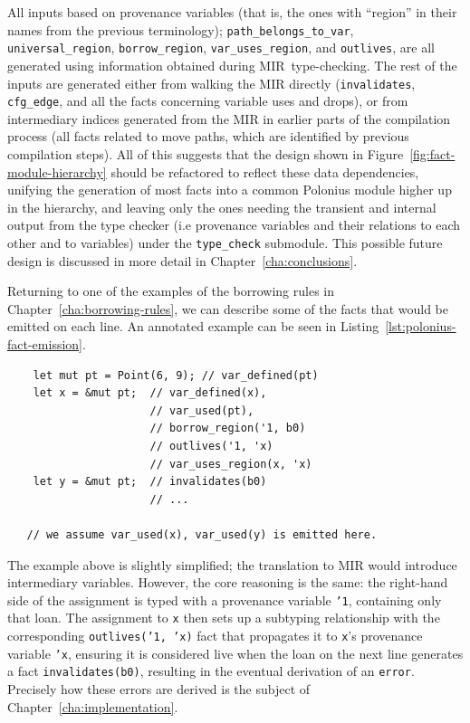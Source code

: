 \documentclass[11pt,a4paper,twoside,openany]{report}
\newenvironment{sourcecode}{\captionsetup{type=listing}}{}
\newcommand{\InRust}[1]{\texttt{#1}}
\newcommand{\InDatalog}[1]{\texttt{#1}}
\begin{document}
All inputs based on provenance variables (that is, the ones with ``region'' in
their names from the previous terminology); \texttt{path\_belongs\_to\_var},
\texttt{universal\_region}, \texttt{borrow\_region}, \texttt{var\_uses\_region},
and \texttt{outlives}, are all generated using information obtained during
MIR~type-checking. The rest of the inputs are generated either from walking the
MIR directly (\texttt{invalidates}, \texttt{cfg\_edge}, and all the facts
concerning variable uses and drops), or from intermediary indices generated from
the MIR in earlier parts of the compilation process (all facts related to move
paths, which are identified by previous compilation steps). All of this suggests
that the design shown in Figure~\ref{fig:fact-module-hierarchy} should be
refactored to reflect these data dependencies, unifying the generation of most
facts into a common Polonius module higher up in the hierarchy, and leaving only
the ones needing the transient and internal output from the type checker (i.e
provenance variables and their relations to each other and to variables) under
the \texttt{type\_check} submodule. This possible future design is discussed in
more detail in Chapter~\ref{cha:conclusions}.

Returning to one of the examples of the borrowing rules in
Chapter~\ref{cha:borrowing-rules}, we can describe some of the facts that would
be emitted on each line. An annotated example can be seen in
Listing~\ref{lst:polonius-fact-emission}.

\begin{sourcecode}
  \label{lst:polonius-fact-emission}
\begin{verbatim}
    let mut pt = Point(6, 9); // var_defined(pt)
    let x = &mut pt;  // var_defined(x),
                      // var_used(pt),
                      // borrow_region('1, b0)
                      // outlives('1, 'x)
                      // var_uses_region(x, 'x)
    let y = &mut pt;  // invalidates(b0)
                      // ...

   // we assume var_used(x), var_used(y) is emitted here.
\end{verbatim}
\end{sourcecode}

The example above is slightly simplified; the translation to MIR would introduce
intermediary variables. However, the core reasoning is the same: the right-hand
side of the assignment is typed with a provenance variable \InRust{'1},
containing only that loan. The assignment to \InRust{x} then sets up a subtyping
relationship with the corresponding \InDatalog{outlives('1, 'x)} fact that
propagates it to \InRust{x}'s provenance variable \InRust{'x}, ensuring it is
considered live when the loan on the next line generates a fact
\InRust{invalidates(b0)}, resulting in the eventual derivation of an
\InRust{error}. Precisely how these errors are derived is the subject of
Chapter~\ref{cha:implementation}.
\end{document}
